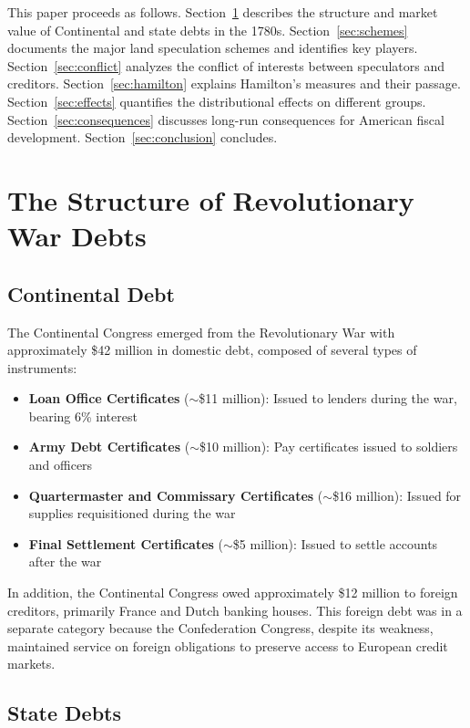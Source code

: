 \documentclass[12pt]{article}
\begin{document}
This paper proceeds as follows. Section~\ref{sec:debt} describes the structure and market value of Continental and state debts in the 1780s. Section~\ref{sec:schemes} documents the major land speculation schemes and identifies key players. Section~\ref{sec:conflict} analyzes the conflict of interests between speculators and creditors. Section~\ref{sec:hamilton} explains Hamilton's measures and their passage. Section~\ref{sec:effects} quantifies the distributional effects on different groups. Section~\ref{sec:consequences} discusses long-run consequences for American fiscal development. Section~\ref{sec:conclusion} concludes.

\section{The Structure of Revolutionary War Debts}\label{sec:debt}

\subsection{Continental Debt}

The Continental Congress emerged from the Revolutionary War with approximately \$42 million in domestic debt, composed of several types of instruments:

\begin{itemize}
\item \textbf{Loan Office Certificates} ($\sim$\$11 million): Issued to lenders during the war, bearing 6\% interest
\item \textbf{Army Debt Certificates} ($\sim$\$10 million): Pay certificates issued to soldiers and officers
\item \textbf{Quartermaster and Commissary Certificates} ($\sim$\$16 million): Issued for supplies requisitioned during the war
\item \textbf{Final Settlement Certificates} ($\sim$\$5 million): Issued to settle accounts after the war
\end{itemize}

In addition, the Continental Congress owed approximately \$12 million to foreign creditors, primarily France and Dutch banking houses. This foreign debt was in a separate category because the Confederation Congress, despite its weakness, maintained service on foreign obligations to preserve access to European credit markets.

\subsection{State Debts}
\end{document}

